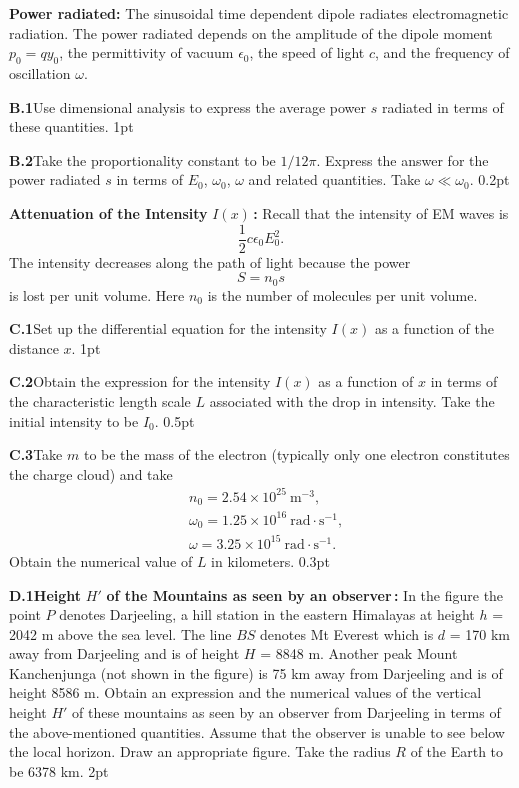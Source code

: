 \textbf{Power radiated:} The sinusoidal time dependent dipole radiates
electromagnetic radiation. The power radiated depends on the amplitude of the
dipole moment $p_0 = qy_0$, the permittivity of vacuum $\epsilon_0$, the speed
of light $c$, and the frequency of oscillation $\omega$.

\textbf{B.1}\quad Use dimensional analysis to express the average power $s$
radiated in terms of these quantities. \hfill 1pt

\textbf{B.2}\quad Take the proportionality constant to be $1/12\pi$. Express
the answer for the power radiated $s$ in terms of $E_0$, $\omega_0$, $\omega$
and related quantities. Take $\omega \ll \omega_0$. \hfill 0.2pt

\textbf{Attenuation of the Intensity} $I(x)$\,\textbf{:} Recall that the
intensity of EM waves is
\begin{equation}
\frac{1}{2}c\epsilon_0E_0^2. \tag{3}
\end{equation}
The intensity decreases along the path of light because the power
\begin{equation}
S = n_0s \tag{4}
\end{equation}
is lost per unit volume. Here $n_0$ is the number of molecules per unit
volume.

\textbf{C.1}\quad Set up the differential equation for the intensity $I(x)$ as
a function of the distance $x$. \hfill 1pt

\textbf{C.2}\quad Obtain the expression for the intensity $I(x)$ as a function
of $x$ in terms of the characteristic length scale $L$ associated with the
drop in intensity. Take the initial intensity to be $I_0$. \hfill 0.5pt

\textbf{C.3}\quad Take $m$ to be the mass of the electron (typically only one
electron constitutes the charge cloud) and take
\begin{align}
&n_0 = 2.54\times10^{25}\ \mathrm{m}^{-3}, \tag{5}\\
&\omega_0 = 1.25\times10^{16}\ \mathrm{rad}\cdot\mathrm{s}^{-1}, \tag{6}\\
&\omega = 3.25\times10^{15}\ \mathrm{rad}\cdot\mathrm{s}^{-1}. \tag{7}
\end{align}
Obtain the numerical value of $L$ in kilometers. \hfill 0.3pt

\textbf{D.1}\quad \textbf{Height} $H'$ \textbf{of the Mountains as seen by an
observer\,:} In the figure the point $P$ denotes Darjeeling, a hill station in
the eastern Himalayas at height $h$ = 2042 m above the sea level. The line
$BS$ denotes Mt Everest which is $d$ = 170 km away from Darjeeling and is of
height $H$ = 8848 m. Another peak Mount Kanchenjunga (not shown in the figure)
is 75 km away from Darjeeling and is of height 8586 m. Obtain an expression
and the numerical values of the vertical height $H'$ of these mountains as
seen by an observer from Darjeeling in terms of the above-mentioned
quantities. Assume that the observer is unable to see below the local
horizon. Draw an appropriate figure. Take the radius $R$ of the Earth to be
6378 km. \hfill 2pt

